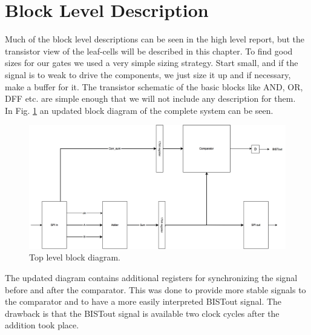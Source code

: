 \section{Block Level Description} \label{sec:block_level}
Much of the block level descriptions can be seen in the high level report, but the transistor view of the leaf-cells will be described in this chapter. To find good sizes for our gates we used a very simple sizing strategy. Start small, and if the signal is to weak to drive the components, we just size it up and if necessary, make a buffer for it. The transistor schematic of the basic blocks like AND, OR, DFF etc. are simple enough that we will not include any description for them. \\

In Fig. \ref{top} an updated block diagram of the complete system can be seen.

\begin{figure}[H]
\centering
\captionsetup{justification=centering}
\includegraphics[scale=0.175]{../figures/top_level.png}
\caption{Top level block diagram.}
\label{top}
\end{figure}

The updated diagram contains additional registers for synchronizing the signal before and after the comparator. This was done to provide more stable signals to the comparator and to have a more easily interpreted BISTout signal. The drawback is that the BISTout signal is available two clock cycles after the addition took place.   
